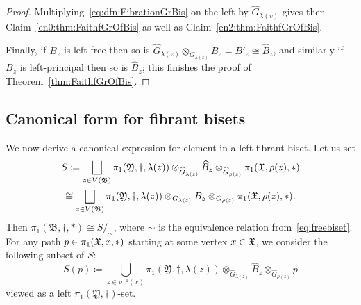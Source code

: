 \documentclass{amsart}
\begin{document}
\begin{proof}
  Multiplying~\eqref{eq:dfn:FibrationGrBis} on the left by $\widehat
  G_{\lambda(v)}$ gives then Claim~\eqref{en0:thm:FaithfGrOfBis} as well as
  Claim~\eqref{en2:thm:FaithfGrOfBis}.
 
  Finally, if $B_z$ is left-free then so is $\widehat
  G_{\lambda(z)}\otimes_{G_{\lambda(z)}} B_z=B'_z\cong \widehat B_z$, and
  similarly if $B_z$ is left-principal then so is $\widehat B_z$; this
  finishes the proof of Theorem~\ref{thm:FaithfGrOfBis}.
\end{proof}

\subsection{Canonical form for fibrant bisets}
We now derive a canonical expression for element in a left-fibrant
biset. Let us set
\begin{multline*}
  S\coloneqq\bigsqcup_{z\in V(\mathfrak B)}\pi_1(\mathfrak Y,\dagger,\lambda(z)) \otimes_{\widehat G_{\lambda(z)}} \widehat B_z \otimes_{\widehat G_{\rho(z)}} \pi_1({\mathfrak X},\rho(z),*)
  \\ \cong\bigsqcup_{z\in V(\mathfrak B)}\pi_1(\mathfrak Y,\dagger,\lambda(z))\otimes_{G_{\lambda(z)}}B_z\otimes_{G_{\rho(z)}}\pi_1({\mathfrak X},\rho(z),*).
\end{multline*}
Then $\pi_1(\mathfrak B, \dagger,*)\cong S/_{\sim}$, where $\sim$ is the
equivalence relation from~\eqref{eq:freebiset}. For any path $p\in
\pi_1({\mathfrak X}, x, *)$ starting at some vertex $x\in{\mathfrak X}$, we consider the
following subset of $S$:
\[S(p)\coloneqq\bigcup_{z\in\rho^{-1}(x)}\pi_1(\mathfrak Y,\dagger,\lambda(z))\otimes_{\widehat G_{\lambda(z)}}\widehat B_z\otimes_{\widehat G_{\rho(z)}} p\]
viewed as a left $\pi_1(\mathfrak Y,\dagger)$-set.
  
\end{document}
